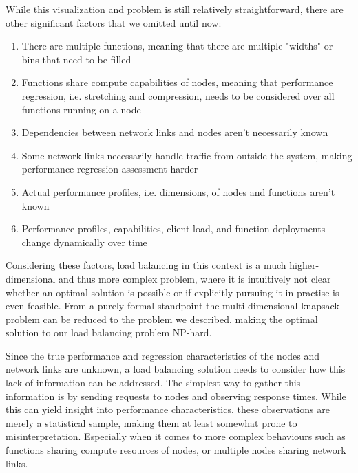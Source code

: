 While this visualization and problem is still relatively straightforward, there are other significant factors that we omitted until now:
\begin{enumerate}
    \item There are multiple functions, meaning that there are multiple "widths" or bins that need to be filled
    \item Functions share compute capabilities of nodes, meaning that performance regression, i.e. stretching and compression, needs to be considered over all functions running on a node
    \item Dependencies between network links and nodes aren't necessarily known
    \item Some network links necessarily handle traffic from outside the system, making performance regression assessment harder
    \item Actual performance profiles, i.e. dimensions, of nodes and functions aren't known
    \item Performance profiles, capabilities, client load, and function deployments change dynamically over time
\end{enumerate}

Considering these factors, load balancing in this context is a much higher-dimensional and thus more complex problem, where it is intuitively not clear whether an optimal solution is possible or if explicitly pursuing it in practise is even feasible. From a purely formal standpoint the multi-dimensional knapsack problem can be reduced to the problem we described, making the optimal solution to our load balancing problem NP-hard. %


Since the true performance and regression characteristics of the nodes and network links are unknown, a load balancing solution needs to consider how this lack of information can be addressed. 
The simplest way to gather this information is by sending requests to nodes and observing response times. While this can yield insight into performance characteristics, these observations are merely a statistical sample, making them at least somewhat prone to misinterpretation. Especially when it comes to more complex behaviours such as functions sharing compute resources of nodes, or multiple nodes sharing network links.


